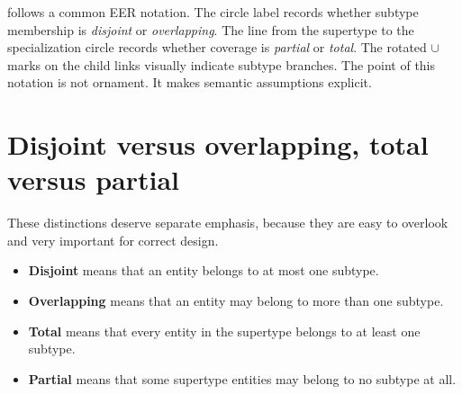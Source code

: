 \documentclass[11pt,a4paper,openany]{book}
\begin{document}
 follows a common EER notation. The circle label records whether subtype membership is \emph{disjoint} or \emph{overlapping}. The line from the supertype to the specialization circle records whether coverage is \emph{partial} or \emph{total}. The rotated \(\cup\) marks on the child links visually indicate subtype branches. The point of this notation is not ornament. It makes semantic assumptions explicit.

\section{Disjoint versus overlapping, total versus partial}
These distinctions deserve separate emphasis, because they are easy to overlook and very important for correct design.

\begin{itemize}
\item \textbf{Disjoint} means that an entity belongs to at most one subtype.
\item \textbf{Overlapping} means that an entity may belong to more than one subtype.
\item \textbf{Total} means that every entity in the supertype belongs to at least one subtype.
\item \textbf{Partial} means that some supertype entities may belong to no subtype at all.
\end{itemize}
\end{document}
